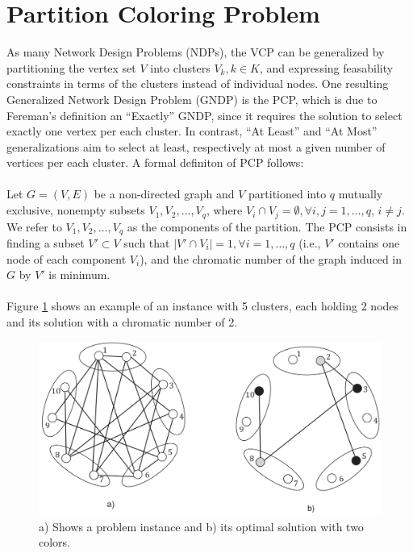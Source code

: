 \section{Partition Coloring Problem}

As many Network Design Problems (NDPs), the VCP can be generalized by partitioning the vertex set $V$ into clusters $V_k, k \in K$, and expressing feasability constraints in terms of the clusters instead of individual nodes. \cite{feremans-03} One resulting Generalized Network Design Problem (GNDP) is the PCP, which is due to Fereman's definition an ``Exactly'' GNDP, since it requires the solution to select exactly one vertex per each cluster. In contrast, ``At Least'' and ``At Most'' generalizations aim to select at least, respectively at most a given number of vertices per each cluster. A formal definiton of PCP follows: \\\\
Let $G = (V, E)$ be a non-directed graph and $V$ partitioned into $q$ mutually exclusive, nonempty subsets $V_1, V_2,\ldots, V_q$, where $V_i \cap V_j = \emptyset, \forall i, j = 1, \ldots , q$, $i \neq j$. We refer to $V_1, V_2, \ldots , V_q$ as the components of the partition. The PCP consists in finding a subset $V' \subset V$ such that $|V' \cap V_i| = 1, \forall i = 1, \ldots , q$ (i.e., $V'$ contains one node of each component $V_i$), and the chromatic number of the graph induced in $G$ by $V'$ is minimum.\\\\
Figure \ref{pd:pcpExample} shows an example of an instance with 5 clusters, each holding 2 nodes and its solution with a chromatic number of 2.

\begin{figure}
\begin{center}
\includegraphics[scale=0.3]{figures/pcp.png}
\caption{a) Shows a problem instance and b) its optimal solution with two colors.}
\label{pd:pcpExample}
\end{center}
\end{figure}


